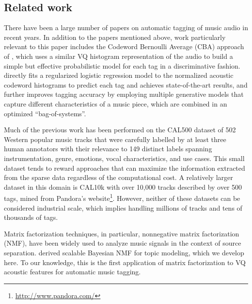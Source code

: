 \subsection{Related work}

There have been a large number of papers on automatic tagging of music audio in recent years.  
In addition to the papers mentioned above, work particularly relevant to this paper includes the Codeword Bernoulli Average (CBA) approach of \citet{hoffman2009easy}, which uses a similar VQ histogram representation of the audio to build a simple but effective probabilistic model for each tag in a discriminative fashion. \citet{xie2011music} directly fits a regularized logistic regression model to the normalized acoustic codeword histograms to predict each tag and achieves state-of-the-art results, and \citet{ellis2013bag} further improves tagging accuracy by employing multiple generative models that capture different characteristics of a music piece, which are combined in an optimized ``bag-of-systems''. 

Much of the previous work has been performed on the CAL500 dataset \cite{Turnbull_SemanticAudio} of 502 Western popular music tracks that were carefully labelled by at least three human annotators with their relevance to 149 distinct labels spanning instrumentation, genre, emotions, vocal characteristics, and use cases. This small dataset tends to reward approaches that can maximize the information extracted from the sparse data regardless of the computational cost. A relatively larger dataset in this domain is CAL10k\cite{tingle2010exploring} with over 10,000 tracks described by over 500 tags, mined from Pandora's website\footnote{\url{http://www.pandora.com/}}. However, neither of these datasets can be considered industrial scale, which implies handling millions of tracks and tens of thousands of tags.

Matrix factorization techniques, in particular, nonnegative matrix factorization (NMF), have been widely used to analyze music signals \citep{hoffman2010bayesian, liang2013beta} in the context of source separation. \citet{paisley2015handbook} derived scalable Bayesian NMF for topic modeling, which we develop here. To our knowledge, this is the first application of matrix factorization to VQ acoustic features for automatic music tagging.



